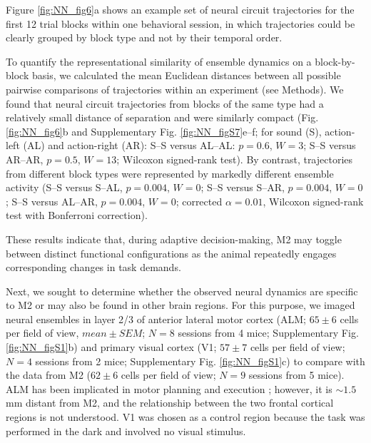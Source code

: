 Figure \ref{fig:NN_fig6}a shows an example set of neural circuit trajectories for the first 12 trial blocks within one behavioral session, in which trajectories could be clearly grouped by block type and not by their temporal order. 


To quantify the representational similarity of ensemble dynamics on a block-by-block basis, we calculated the mean Euclidean distances between all possible pairwise comparisons of trajectories within an experiment (see Methods). We found that neural circuit trajectories from blocks of the same type had a relatively small distance of separation and were similarly compact (Fig. \ref{fig:NN_fig6}b and Supplementary Fig. \ref{fig:NN_figS7}e--f; for sound (S), action-left (AL) and action-right (AR): S--S versus AL--AL: $p = 0.6$, $W = 3$; S--S versus AR--AR, $p = 0.5$, $W = 13$; Wilcoxon signed-rank test). By contrast, trajectories from different block types were represented by markedly different ensemble activity (S–S versus S–AL, $p = 0.004$, $W = 0$; S–S versus S–AR, $p = 0.004$, $W = 0$; S–S versus AL–AR, $p = 0.004$, $W = 0$; corrected $\alpha = 0.01$, Wilcoxon signed-rank test with Bonferroni correction). 

These results indicate that, during adaptive decision-making, M2 may toggle between distinct functional configurations as the animal repeatedly engages corresponding changes in task demands.

Next, we sought to determine whether the observed neural dynamics are specific to M2 or may also be found in other brain regions. For this purpose, we imaged neural ensembles in layer 2/3 of anterior lateral motor cortex (ALM; $65 \pm 6$ cells per field of view, $\mathit{mean}\pm\mathit{SEM}$; $N = 8$ sessions from 4 mice; Supplementary Fig. \ref{fig:NN_figS1}b) and primary visual cortex (V1; $57 \pm 7$ cells per field of view; $N = 4$ sessions from 2 mice; Supplementary Fig. \ref{fig:NN_figS1}c) to compare with the data from M2 ($62 \pm 6$ cells per field of view; $N = 9$ sessions from 5 mice). ALM has been implicated in motor planning and execution \citep{guo2014flow,li2015motor}; however, it is $\sim 1.5$ mm distant from M2, and the relationship between the two frontal cortical regions is not understood. V1 was chosen as a control region because the task was performed in the dark and involved no visual stimulus. 

